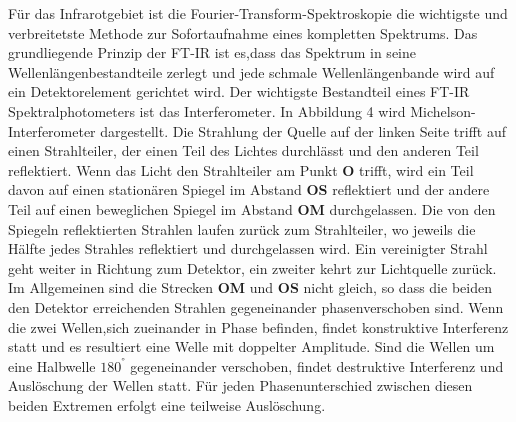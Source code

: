 \documentclass[12pt]{article}
\begin{document}
Für das Infrarotgebiet ist die Fourier-Transform-Spektroskopie die wichtigste und verbreitetste Methode zur Sofortaufnahme eines kompletten
Spektrums. Das grundliegende Prinzip der FT-IR ist es,dass das Spektrum in seine Wellenlängenbestandteile zerlegt und jede schmale Wellenlängenbande wird auf ein Detektorelement gerichtet wird. 
Der wichtigste Bestandteil eines FT-IR Spektralphotometers ist das Interferometer. In Abbildung 4 wird  Michelson-Interferometer dargestellt.  Die Strahlung der Quelle auf der linken Seite trifft auf einen Strahlteiler, der einen Teil des Lichtes durchlässt und den anderen Teil reflektiert. Wenn das Licht den Strahlteiler am Punkt \textbf{O} trifft, wird ein Teil davon auf einen stationären Spiegel
im Abstand \textbf{OS} reflektiert und der andere Teil auf einen beweglichen Spiegel im Abstand \textbf{OM} durchgelassen. Die von den Spiegeln reflektierten Strahlen laufen zurück zum Strahlteiler, wo jeweils die Hälfte jedes Strahles reflektiert und durchgelassen wird. Ein vereinigter Strahl geht weiter in Richtung zum Detektor, ein zweiter kehrt zur Lichtquelle zurück.
Im Allgemeinen sind die Strecken \textbf{OM} und \textbf{OS} nicht gleich, so dass die beiden den
Detektor erreichenden Strahlen gegeneinander phasenverschoben sind. Wenn die zwei Wellen,sich zueinander in Phase befinden, findet konstruktive Interferenz statt und es resultiert eine Welle mit doppelter Amplitude.
Sind die Wellen um eine Halbwelle $180^°$ gegeneinander verschoben,
findet destruktive Interferenz und Auslöschung der Wellen statt. Für jeden Phasenunterschied zwischen diesen beiden Extremen erfolgt eine teilweise Auslöschung.
\end{document}
